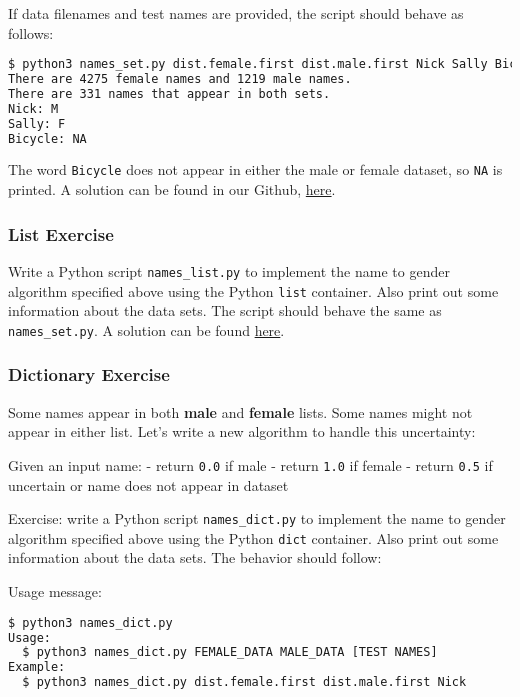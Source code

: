 \documentclass[12pt,letterpaper,twoside]{article}
\begin{document}
If data filenames and test names are provided, the script should behave
as follows:

\begin{lstlisting}[language=bash]
$ python3 names_set.py dist.female.first dist.male.first Nick Sally Bicycle
There are 4275 female names and 1219 male names.
There are 331 names that appear in both sets.
Nick: M
Sally: F
Bicycle: NA
\end{lstlisting}

The word \texttt{Bicycle} does not appear in either the male or female
dataset, so \texttt{NA} is printed. 
A solution can be found in our Github, \href{https://github.com/CME211/notes/blob/fall_18/lecture-03/names_set.py}{here}.

\subsubsection{List Exercise}
Write a Python script \texttt{names\_list.py} to implement the
name to gender algorithm specified above using the Python \texttt{list}
container. Also print out some information about the data sets.
The script should behave the same as \texttt{names\_set.py}. A solution can
be found \href{https://github.com/CME211/notes/blob/fall_18/lecture-03/names_list.py}{here}.

\subsubsection{Dictionary Exercise}
Some names appear in both \textbf{male} and \textbf{female} lists. Some
names might not appear in either list. Let's write a new algorithm to
handle this uncertainty:

Given an input name: - return \texttt{0.0} if male - return \texttt{1.0}
if female - return \texttt{0.5} if uncertain or name does not appear in
dataset

Exercise: write a Python script \texttt{names\_dict.py} to implement the
name to gender algorithm specified above using the Python \texttt{dict}
container. Also print out some information about the data sets. The
behavior should follow:

Usage message:

\begin{lstlisting}[language=bash]
$ python3 names_dict.py
Usage:
  $ python3 names_dict.py FEMALE_DATA MALE_DATA [TEST NAMES]
Example:
  $ python3 names_dict.py dist.female.first dist.male.first Nick
\end{lstlisting}
\end{document}
